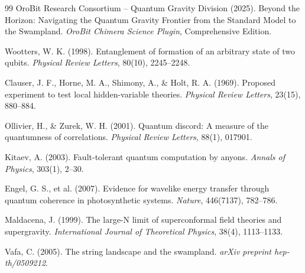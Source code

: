 \documentclass[11pt,a4paper]{article}
\begin{document}
\begin{thebibliography}{99}
OroBit Research Consortium -- Quantum Gravity Division (2025).
Beyond the Horizon: Navigating the Quantum Gravity Frontier from the Standard Model to the Swampland.
\textit{OroBit Chimera Science Plugin}, Comprehensive Edition.

Wootters, W. K. (1998).
Entanglement of formation of an arbitrary state of two qubits.
\textit{Physical Review Letters}, 80(10), 2245--2248.

Clauser, J. F., Horne, M. A., Shimony, A., \& Holt, R. A. (1969).
Proposed experiment to test local hidden-variable theories.
\textit{Physical Review Letters}, 23(15), 880--884.

Ollivier, H., \& Zurek, W. H. (2001).
Quantum discord: A measure of the quantumness of correlations.
\textit{Physical Review Letters}, 88(1), 017901.

Kitaev, A. (2003).
Fault-tolerant quantum computation by anyons.
\textit{Annals of Physics}, 303(1), 2--30.

Engel, G. S., et al. (2007).
Evidence for wavelike energy transfer through quantum coherence in photosynthetic systems.
\textit{Nature}, 446(7137), 782--786.

Maldacena, J. (1999).
The large-N limit of superconformal field theories and supergravity.
\textit{International Journal of Theoretical Physics}, 38(4), 1113--1133.

Vafa, C. (2005).
The string landscape and the swampland.
\textit{arXiv preprint hep-th/0509212}.

\end{thebibliography}
\end{document}
